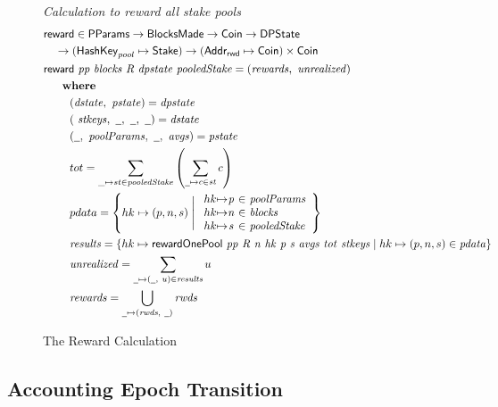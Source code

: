 \begin{figure}[htb]
  \emph{Calculation to reward all stake pools}
  \begin{align*}
      & \fun{reward} \in \PParams \to \BlocksMade \to \Coin\to \DPState \\
      & ~~~ \to (\HashKey_{pool} \mapsto \Stake) \to (\AddrRWD \mapsto \Coin)\times\Coin \\
      & \reward{pp}{blocks}{R}{dpstate}{pooledStake} = (\var{rewards},~\var{unrealized})\\
      & ~~~\where \\
      & ~~~~~~~(\var{dstate},~\var{pstate}) = \var{dpstate} \\
      & ~~~~~~~(~\var{stkeys},~\wcard,~\wcard,~\wcard) = \var{dstate} \\
      & ~~~~~~~(\wcard,~\var{poolParams},~\wcard,~\var{avgs}) = \var{pstate} \\
      & ~~~~~~~tot = \sum_{\_\mapsto st\in \var{pooledStake}}
                       \left(
                       \sum_{\wcard\mapsto c\in\var{st}}c
                       \right) \\
      & ~~~~~~~pdata = \left\{
        hk\mapsto (p, n, s)  \mathrel{\Bigg|}
        \begin{array}{r@{\mapsto}c@{~\in~}l}
          hk & \var{p} & \var{poolParams} \\
          hk & \var{n} & \var{blocks} \\
          hk & \var{s} & \var{pooledStake} \\
        \end{array}
      \right\} \\
      & ~~~~~~~\var{results} = \left\{
                 hk \mapsto \rewardOnePool{pp}{R}{n}{hk}{p}{s}{avgs}{tot}{stkeys}
                 \mid
                 hk\mapsto(p, n, s)\in\var{pdata} \right\} \\
      & ~~~~~~~\var{unrealized} = \sum_{\wcard\mapsto (\wcard,~u)\in\var{results}}u \\
      & ~~~~~~~\var{rewards} = \bigcup_{\wcard\mapsto(\var{rwds},~\wcard)}\var{rwds}
  \end{align*}
  \caption{The Reward Calculation}
  \label{fig:functions:reward-calc}
\end{figure}

\clearpage

\subsection{Accounting Epoch Transition}
\label{sec:acc-trans}

